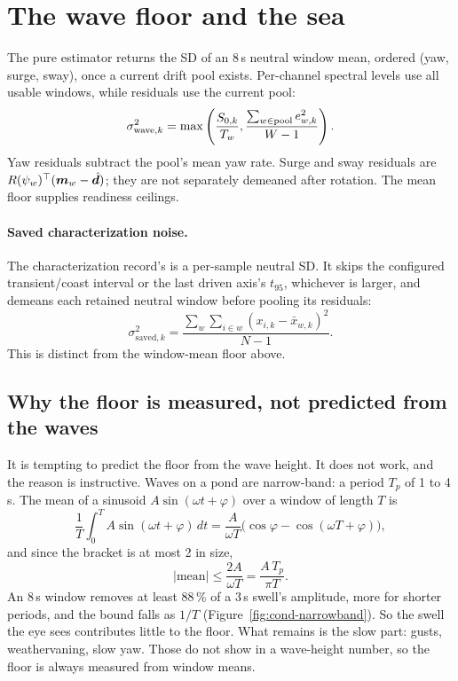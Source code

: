 \section{The wave floor and the sea}
\label{sec:cond-floor}

The pure estimator returns the SD of an 8\,s neutral window mean, ordered
(yaw, surge, sway), once a current drift pool exists. Per-channel spectral levels
use all usable windows, while residuals use the current pool:
\[
 \sigma_{\mathrm{wave},k}^2=\max\left(\frac{S_{0,k}}{T_w},
             \frac{\sum_{w\in\mathrm{pool}} e_{w,k}^2}{W-1}\right).
\]
Yaw residuals subtract the pool's mean yaw rate. Surge and sway residuals are
$R(\psi_w)^\top(\bm m_w-\hat{\bm d})$; they are not separately demeaned after rotation.
The mean floor supplies readiness ceilings.

\paragraph{Saved characterization noise.} The characterization record's
 is a per-sample neutral SD. It skips the configured
transient/coast interval or the last driven axis's $t_{95}$, whichever is larger,
and demeans each retained neutral window before pooling its residuals:
\[
 \sigma_{\mathrm{saved},k}^2=\frac{\sum_w\sum_{i\in w}(x_{i,k}-\bar x_{w,k})^2}{N-1}.
\]
This is distinct from the window-mean floor above.

\subsection{Why the floor is measured, not predicted from the waves}

It is tempting to predict the floor from the wave height. It does not work, and
the reason is instructive. Waves on a pond are narrow-band: a period $T_p$ of 1 to
4\,s. The mean of a sinusoid $A\sin(\omega t + \varphi)$ over a window of length
$T$ is
\[
  \frac1T\int_0^T A\sin(\omega t+\varphi)\,dt = \frac{A}{\omega T}\big(\cos\varphi - \cos(\omega T + \varphi)\big),
\]
and since the bracket is at most 2 in size,
\[
  |\text{mean}| \le \frac{2A}{\omega T} = \frac{A\,T_p}{\pi T}.
\]
An 8\,s window removes at least 88\,\% of a 3\,s swell's amplitude, more for shorter
periods, and the bound falls as $1/T$ (Figure~\ref{fig:cond-narrowband}). So the
swell the eye sees contributes little to the floor. What remains is the slow part:
gusts, weathervaning, slow yaw. Those do not show in a wave-height number, so the
floor is always measured from window means.

